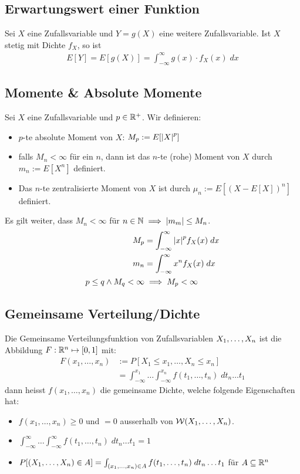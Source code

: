 \subsection*{Erwartungswert einer Funktion}
Sei $X$ eine Zufallsvariable und $Y = g (X)$ eine weitere Zufallsvariable. Ist
$X$ stetig mit Dichte $f_X$, so ist
\begin{align*}
  E[Y] = E[g (X)] = \int_{-\infty}^\infty g (x) \cdot f_X (x) \; dx
\end{align*}
\subsection*{Momente \& Absolute Momente}
Sei $X$ eine Zufallsvariable und $p \in \mathbb{R}^+$. Wir definieren:
\begin{itemize}
  \item $p$-te absolute Moment von $X$: $M_p := E[\abs{X}^p]$
  \item falls $M_n < \infty$ für ein $n$, dann ist das $n$-te (rohe) Moment von $X$
        durch $m_n := E[X^n]$ definiert.
  \item Das $n$-te zentralisierte Moment von $X$ ist durch $\mu_n := E[ (X - E[X])^n]$
        definiert.
\end{itemize}
Es gilt weiter, dass $M_n < \infty$ für $n \in \mathbb{N} \implies \abs{m_m} \leq M_n$.
\begin{align*}
  M_p                         & = \int_{-\infty}^\infty \abs{x}^p f_X (x) \; dx \\
  m_n                         & = \int_{-\infty}^\infty x^n f_X (x) \; dx       \\
  p \leq q \land M_q < \infty & \implies M_p < \infty
\end{align*}
\subsection*{Gemeinsame Verteilung/Dichte}
Die Gemeinsame Verteilungsfunktion von Zufallsvariablen $X_1, \dots, X_n$ ist
die Abbildung $F: \mathbb{R}^n \mapsto [0, 1]$ mit:
\begin{align*}
  F (x_1, \dots, x_n) & := P[X_1 \leq x_1, \dots, X_n \leq x_n]                                                 \\
                      & = \int_{-\infty}^{x_1} \dots \int_{-\infty}^{x_n} f (t_1, \dots, t_n) \; dt_n \dots t_1
\end{align*}
dann heisst $f (x_1, \dots, x_n)$ die gemeinsame Dichte, welche folgende
Eigenschaften hat:
\begin{itemize}
  \item $f (x_1, \dots, x_n) \geq 0$ und $= 0$ ausserhalb von $\mathcal{W} (X_1, \dots, X_n)$.
  \item $\int_{-\infty}^\infty \dots \int_{-\infty}^\infty f (t_1, \dots, t_n) \; dt_n \dots t_1 = 1$
  \item $P[ (X_1, \dots, X_n) \in A] = \int_{ (x_1, \dots, x_n) \in A} f (t_1, \dots, t_n) \; dt_n \dots t_1$ für $A \subseteq \mathbb{R}^n$
\end{itemize}
